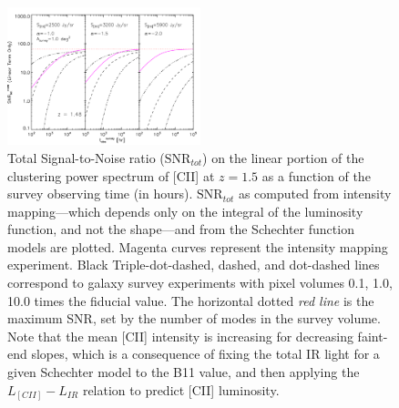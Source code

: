 \documentclass[12pt,preprint]{emulateapj}
\begin{document}
\begin{figure}[h]
 \centering
 \includegraphics[width=0.5\textwidth]{SNRtot_starfire_cii_1sqdeg_z1p5_tsurvey_alpham_im_VpixR450_0p1Vpix_10Vpix_Lstar1d12_Lmin1d8_Lmax1d13}
\caption{Total Signal-to-Noise ratio ($\textrm{SNR}_{tot}$) on the linear portion of the clustering power spectrum of [CII] at $z=1.5$ as a function of the survey observing time (in hours). $\textrm{SNR}_{tot}$ as computed from intensity mapping---which depends only on the integral of the luminosity function, and not the shape---and from the Schechter function models are plotted. Magenta curves represent the intensity mapping experiment. Black Triple-dot-dashed, dashed, and dot-dashed lines correspond to galaxy survey experiments with pixel volumes 0.1, 1.0, 10.0 times the fiducial value. The horizontal dotted \emph{red line} is the maximum SNR, set by the number of modes in the survey volume. Note that the mean [CII] intensity is increasing for decreasing faint-end slopes, which is a consequence of fixing the total IR light for a given Schechter model to the B11 value, and then applying the $L_{[CII]}-L_{IR}$ relation to predict [CII] luminosity.}
 \label{fig:snr_vs_time_z1p5}
\end{figure}
\end{document}
